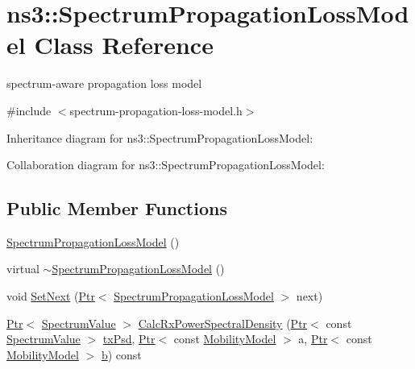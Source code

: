 \hypertarget{classns3_1_1SpectrumPropagationLossModel}{}\section{ns3\+:\+:Spectrum\+Propagation\+Loss\+Model Class Reference}
\label{classns3_1_1SpectrumPropagationLossModel}


spectrum-\/aware propagation loss model  




{\ttfamily \#include $<$spectrum-\/propagation-\/loss-\/model.\+h$>$}



Inheritance diagram for ns3\+:\+:Spectrum\+Propagation\+Loss\+Model\+:


Collaboration diagram for ns3\+:\+:Spectrum\+Propagation\+Loss\+Model\+:
\subsection*{Public Member Functions}
\begin{DoxyCompactItemize}
\item 
\hyperlink{classns3_1_1SpectrumPropagationLossModel_a0cd63e474494f365e120172c23966c82}{Spectrum\+Propagation\+Loss\+Model} ()
\item 
virtual \hyperlink{classns3_1_1SpectrumPropagationLossModel_a5d918666c265fffb997e7c7039eb2dca}{$\sim$\+Spectrum\+Propagation\+Loss\+Model} ()
\item 
void \hyperlink{classns3_1_1SpectrumPropagationLossModel_a8270cce4c11a33a0eaa9e2561d382824}{Set\+Next} (\hyperlink{classns3_1_1Ptr}{Ptr}$<$ \hyperlink{classns3_1_1SpectrumPropagationLossModel}{Spectrum\+Propagation\+Loss\+Model} $>$ next)
\item 
\hyperlink{classns3_1_1Ptr}{Ptr}$<$ \hyperlink{classns3_1_1SpectrumValue}{Spectrum\+Value} $>$ \hyperlink{classns3_1_1SpectrumPropagationLossModel_ad2e3992f45303b205cfc8cdc0ec75202}{Calc\+Rx\+Power\+Spectral\+Density} (\hyperlink{classns3_1_1Ptr}{Ptr}$<$ const \hyperlink{classns3_1_1SpectrumValue}{Spectrum\+Value} $>$ \hyperlink{lte__link__budget__x2__handover__measures_8m_a684fe3101a5e48a5fcc57cab8dbcd1aa}{tx\+Psd}, \hyperlink{classns3_1_1Ptr}{Ptr}$<$ const \hyperlink{classns3_1_1MobilityModel}{Mobility\+Model} $>$ a, \hyperlink{classns3_1_1Ptr}{Ptr}$<$ const \hyperlink{classns3_1_1MobilityModel}{Mobility\+Model} $>$ \hyperlink{lte__pathloss_8m_a21ad0bd836b90d08f4cf640b4c298e7c}{b}) const 
\end{DoxyCompactItemize}
